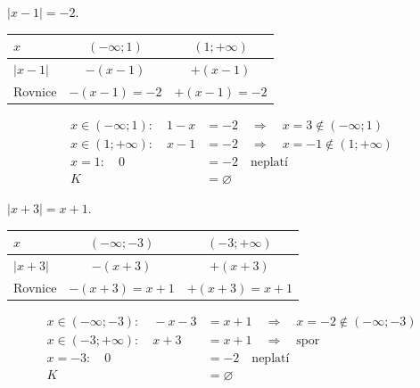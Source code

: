 \documentclass[11pt,a4paper]{article}
\begin{document}
\begin{zadaniReseniBox}[title={Samostatná práce 3}]
$|x-1|=-2$.
\tcblower
\begin{center}
\begingroup\footnotesize
\renewcommand{\arraystretch}{1.32}
\begin{tabular}{@{}lcc@{}}
\toprule
$x$ & $(-\infty;1)$ & $(1;+\infty)$ \\
\midrule
$|x - 1|$ & $-(x - 1)$ & $+(x - 1)$ \\
\midrule
Rovnice & $-(x - 1)=-2$ & $+(x - 1)=-2$ \\
\bottomrule
\end{tabular}
\endgroup
\end{center}
\[\begin{aligned}x\in (-\infty;1):\quad 1 - x &= -2\quad\Longrightarrow\quad x=3\notin (-\infty;1)\\[2pt]
x\in (1;+\infty):\quad x - 1 &= -2\quad\Longrightarrow\quad x=-1\notin (1;+\infty)\\[2pt]
x=1:\quad 0 &= -2\quad\text{neplatí}\\[2pt]
K&=\varnothing\end{aligned}\]
\end{zadaniReseniBox}
\begin{zadaniReseniBox}[title={Samostatná práce 4}]
$|x+3|=x+1$.
\tcblower
\begin{center}
\begingroup\footnotesize
\renewcommand{\arraystretch}{1.32}
\begin{tabular}{@{}lcc@{}}
\toprule
$x$ & $(-\infty;-3)$ & $(-3;+\infty)$ \\
\midrule
$|x + 3|$ & $-(x + 3)$ & $+(x + 3)$ \\
\midrule
Rovnice & $-(x + 3)=x + 1$ & $+(x + 3)=x + 1$ \\
\bottomrule
\end{tabular}
\endgroup
\end{center}
\[\begin{aligned}x\in (-\infty;-3):\quad - x - 3 &= x + 1\quad\Longrightarrow\quad x=-2\notin (-\infty;-3)\\[2pt]
x\in (-3;+\infty):\quad x + 3 &= x + 1\quad\Longrightarrow\quad \text{spor}\\[2pt]
x=-3:\quad 0 &= -2\quad\text{neplatí}\\[2pt]
K&=\varnothing\end{aligned}\]
\end{zadaniReseniBox}
\end{document}
